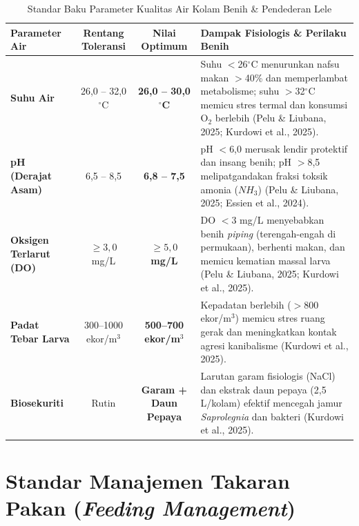 \documentclass[11pt,a4paper]{article}
\begin{document}
\begin{table}[h!]
\centering
\small
\caption{Standar Baku Parameter Kualitas Air Kolam Benih \& Pendederan Lele}
\vspace{4pt}
\begin{tabularx}{\textwidth}{l c c X}
\toprule
\textbf{Parameter Air} & \textbf{Rentang Toleransi} & \textbf{Nilai Optimum} & \textbf{Dampak Fisiologis \& Perilaku Benih} \\
\midrule
\textbf{Suhu Air} & 26,0 -- 32,0 $^\circ$C & \textbf{26,0 -- 30,0 $^\circ$C} & Suhu $<$26$^\circ$C menurunkan nafsu makan $>$40\% dan memperlambat metabolisme; suhu $>$32$^\circ$C memicu stres termal dan konsumsi O$_2$ berlebih (Pelu \& Liubana, 2025; Kurdowi et al., 2025). \\
\addlinespace
\textbf{pH (Derajat Asam)} & 6,5 -- 8,5 & \textbf{6,8 -- 7,5} & pH $<$6,0 merusak lendir protektif dan insang benih; pH $>$8,5 melipatgandakan fraksi toksik amonia ($NH_3$) (Pelu \& Liubana, 2025; Essien et al., 2024). \\
\addlinespace
\textbf{Oksigen Terlarut (DO)} & $\ge 3,0$ mg/L & \textbf{$\ge 5,0$ mg/L} & DO $<$3 mg/L menyebabkan benih \textit{piping} (terengah-engah di permukaan), berhenti makan, dan memicu kematian massal larva (Pelu \& Liubana, 2025; Kurdowi et al., 2025). \\
\addlinespace
\textbf{Padat Tebar Larva} & 300--1000 ekor/m$^3$ & \textbf{500--700 ekor/m$^3$} & Kepadatan berlebih ($>$800 ekor/m$^3$) memicu stres ruang gerak dan meningkatkan kontak agresi kanibalisme (Kurdowi et al., 2025). \\
\addlinespace
\textbf{Biosekuriti} & Rutin & \textbf{Garam + Daun Pepaya} & Larutan garam fisiologis (NaCl) dan ekstrak daun pepaya (2,5 L/kolam) efektif mencegah jamur \textit{Saprolegnia} dan bakteri (Kurdowi et al., 2025). \\
\bottomrule
\end{tabularx}
\end{table}

\section{Standar Manajemen Takaran Pakan (\textit{Feeding Management})}
\end{document}

